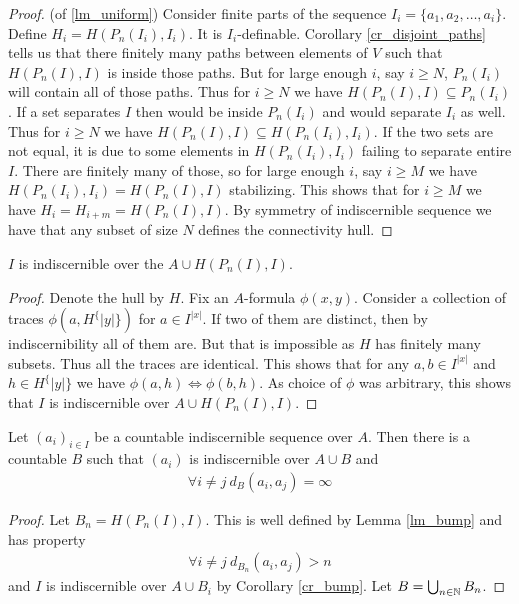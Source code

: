 \begin{proof}(of \ref{lm_uniform})
	Consider finite parts of the sequence $I_i = \{a_1, a_2, \ldots, a_i\}$.
	Define $H_i = H(P_n(I_i), I_i)$.
	It is $I_i$-definable. %
	Corollary \ref{cr_disjoint_paths} tells us that there finitely many paths between elements of $V$ such that $H(P_n(I), I)$ is inside those paths.
	But for large enough $i$, say $i \geq N$, $P_n(I_i)$ will contain all of those paths.
	Thus for $i \geq N$ we have $H(P_n(I), I) \subseteq P_n(I_i)$.
	If a set separates $I$ then would be inside $P_n(I_i)$ and would separate $I_i$ as well.
	Thus for $i \geq N$ we have $H(P_n(I), I) \subseteq H(P_n(I_i), I_i)$.
	If the two sets are not equal, it is due to some elements in $H(P_n(I_i), I_i)$ failing to separate entire $I$. There are finitely many of those, so for large enough $i$, say $i \geq M$ we have $H(P_n(I_i), I_i) = H(P_n(I), I)$ stabilizing.
	This shows that for $i \geq M$ we have $H_i = H_{i+m} = H(P_n(I), I)$. By symmetry of indiscernible sequence we have that any subset of size $N$ defines the connectivity hull.
\end{proof}

\begin{Lemma} \label{cr_bump}
	$I$ is indiscernible over the $A \cup H(P_n(I), I)$.
\end{Lemma}

\begin{proof}
	Denote the hull by $H$. Fix an $A$-formula $\phi(x,y)$. Consider a collection of traces $\phi(a, H^\{|y|\})$ for $a \in I^{|x|}$. If two of them are distinct, then by indiscernibility all of them are. But that is impossible as $H$ has finitely many subsets. Thus all the traces are identical. This shows that for any $a,b \in I^{|x|}$ and $h \in H^\{|y|\}$ we have $\phi(a, h) \iff \phi(b, h)$. As choice of $\phi$ was arbitrary, this shows that $I$ is indiscernible over $A \cup H(P_n(I), I)$.
\end{proof}

\begin{Corollary} 
	Let $(a_i)_{i \in I}$ be a countable indiscernible sequence over $A$. Then there is a countable $B$ such that  $(a_i)$ is indiscernible over $A \cup B$ and
	\begin{align*}
		\forall i \neq j \ d_B(a_i, a_j) = \infty
	\end{align*}
\end{Corollary}

\begin{proof}
	Let $B_n = H(P_n(I), I)$. This is well defined by Lemma \ref{lm_bump} and has property
	\begin{align*}
		\forall i \neq j \ d_{B_n}(a_i, a_j) > n
	\end{align*}
	and $I$ is indiscernible over $A \cup B_i$ by Corollary \ref{cr_bump}. Let $B = \bigcup_{n \in \mathbb{N}} B_n$.
\end{proof}

